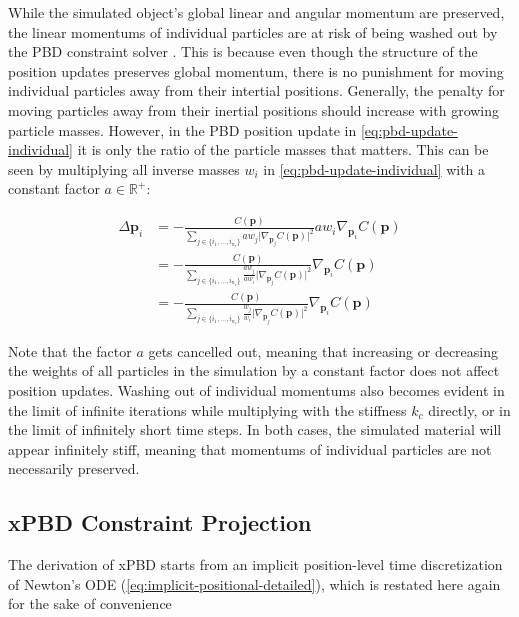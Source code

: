 While the simulated object's global linear and angular momentum are preserved, the linear momentums of individual particles are at risk of 
being washed out by the PBD constraint solver \cite{bouaziz2014}. This is because even though the structure of the position updates 
preserves global momentum, there is no punishment for moving individual particles away from their intertial positions. Generally, the 
penalty for moving particles away from their inertial positions should increase with growing particle masses. However, in the PBD
position update in \cref{eq:pbd-update-individual} it is only the ratio of the particle masses that matters. This can be seen by multiplying
all inverse masses $w_i$ in \cref{eq:pbd-update-individual} with a constant factor $a \in \mathbb{R}^+$:

\begin{align*}
    \Delta \bm{p}_i 
    &= -\frac{C(\bm{p})}{\sum_{j \in \{ i_1, \ldots, i_{n_c} \}} aw_j \vert \nabla_{\bm{p}_j}C(\bm{p}) \vert^2 } aw_i \nabla_{\bm{p}_i} C(\bm{p}) \\
    &= -\frac{C(\bm{p})}{\sum_{j \in \{ i_1, \ldots, i_{n_c} \}} \frac{aw_j}{aw_i} \vert \nabla_{\bm{p}_j}C(\bm{p}) \vert^2 } \nabla_{\bm{p}_i} C(\bm{p}) \\
    &= -\frac{C(\bm{p})}{\sum_{j \in \{ i_1, \ldots, i_{n_c} \}} \frac{w_j}{w_i} \vert \nabla_{\bm{p}_j}C(\bm{p}) \vert^2 } \nabla_{\bm{p}_i} C(\bm{p})
\end{align*}

\noindent Note that the factor $a$ gets cancelled out, meaning that increasing or decreasing the weights of all particles in the simulation by a constant
factor does not affect position updates. Washing out of individual momentums also becomes evident in the limit of infinite iterations while multiplying 
with the stiffness $k_c$ directly, or in the limit of infinitely short time steps. In both cases, the simulated material will appear infinitely stiff, 
meaning that momentums of individual particles are not necessarily preserved.

\subsection{xPBD Constraint Projection}\label{ss:xpbd-constraint-projection}
The derivation of xPBD \cite{macklin2016} starts from an implicit position-level time discretization of Newton's ODE 
(\cref{eq:implicit-positional-detailed}), which is restated here again for the sake of convenience

